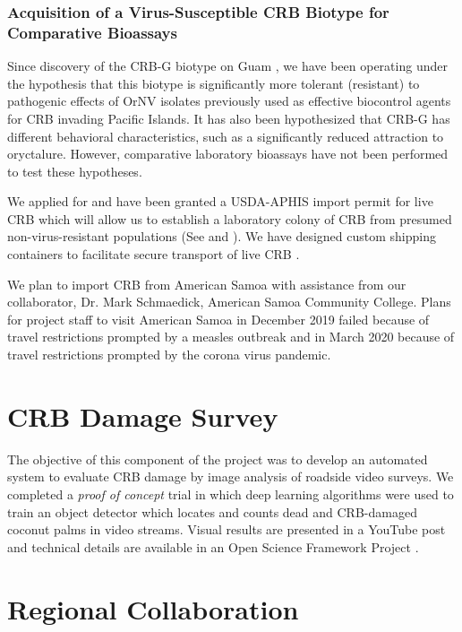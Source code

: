 \documentclass[12pt,
letterpaper,english,bibliography=totocnumbered, abstract=on]{scrartcl}
\begin{document}
\subsubsection{Acquisition of a Virus-Susceptible CRB Biotype for Comparative Bioassays}

Since discovery of the CRB-G biotype on Guam \parencite{marshall_new_2017-1}, we have been operating under the hypothesis that this biotype is significantly more tolerant (resistant) to pathogenic effects of OrNV isolates previously used as effective biocontrol agents for CRB invading Pacific Islands. It has also been hypothesized that CRB-G has different behavioral characteristics, such as a significantly reduced attraction to oryctalure. However, comparative laboratory bioassays have not been performed to test these hypotheses.

We applied for and have been granted a USDA-APHIS import permit for live CRB which will allow us to establish a laboratory colony of CRB from presumed non-virus-resistant populations (See \parencite{moore_additional_2019} and \parencite{usda-aphis_crb_2019}). We have designed custom shipping containers to facilitate secure transport of live CRB \parencite{moore_container_2017-1}.

We plan to import CRB from American Samoa with assistance from our collaborator, Dr. Mark Schmaedick, American Samoa Community College. Plans for project staff to visit American Samoa in December 2019 failed because of travel restrictions prompted by a measles outbreak and in March 2020 because of travel restrictions prompted by the corona virus pandemic. 

\section{CRB Damage Survey}

The objective of this component of the project was to develop an automated system to evaluate CRB damage by image analysis of roadside video surveys.  We completed a \textit{proof of concept} trial in which deep learning algorithms were used to train an object detector which locates and counts dead and CRB-damaged coconut palms in video streams.  Visual results are presented in a YouTube post \parencite{moore_training_2019} and technical details are available in an Open Science Framework Project \parencite{moore_open_2019}.

\section{Regional Collaboration}
\end{document}
